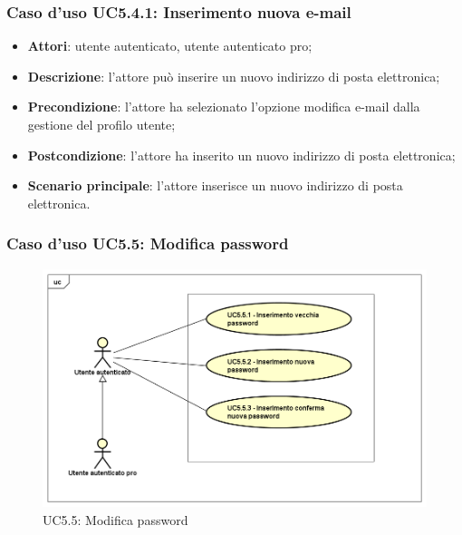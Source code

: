 \subsubsection{Caso d'uso UC5.4.1: Inserimento nuova e-mail}

\begin{itemize}
	\item \textbf{Attori}: utente autenticato, utente autenticato pro;
	\item \textbf{Descrizione}: l'attore può inserire un nuovo indirizzo di posta elettronica;
	\item \textbf{Precondizione}:  l'attore ha selezionato l'opzione modifica e-mail dalla gestione del profilo utente;
	\item \textbf{Postcondizione}: l'attore ha inserito un nuovo indirizzo di posta elettronica;
	\item \textbf{Scenario principale}: l'attore inserisce un nuovo indirizzo di posta elettronica.
\end{itemize}

\subsubsection{Caso d'uso UC5.5: Modifica password}
\label{UC5.5}
\begin{figure}[h]
	\centering
	\includegraphics[scale=0.5,keepaspectratio]{UML/UC5_5.png}
	\caption{UC5.5: Modifica password}
\end{figure}

